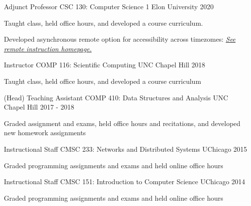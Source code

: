 
\begin{cventries}

  \cventry
    {Adjunct Professor} %
    {CSC 130: Computer Science 1} %
    {Elon University} %
    {2020} %
    {
      \begin{cvitems} %
        \item {Taught class, held office hours, and developed a course curriculum.}
        \item {Developed asynchronous remote option for accessibility across timezomes: \href{https://csc130s2020.wordpress.com/}{\textit{See remote instruction homepage.}}}
      \end{cvitems}
    }



  \cventry
    {Instructor} %
    {COMP 116: Scientific Computing} %
    {UNC Chapel Hill} %
    {2018} %
    {
      \begin{cvitems} %
        \item {Taught class, held office hours, and developed a course curriculum}
      \end{cvitems}
    }

  \cventry
    {(Head) Teaching Assistant} %
    {COMP 410: Data Structures and Analysis} %
    {UNC Chapel Hill} %
    {2017 - 2018} %
    {
      \begin{cvitems} %
        \item {Graded assignment and exams, held office hours and recitations, and developed new homework assignments}
      \end{cvitems}
    }

  \cventry
    {Instructional Staff} %
    {CMSC 233: Networks and Distributed Systems} %
    {UChicago} %
    {2015} %
    {
      \begin{cvitems} %
        \item {Graded programming assignments and exams and held online office hours}
      \end{cvitems}
    }
	
  \cventry
    {Instructional Staff} %
    {CMSC 151: Introduction to Computer Science} %
    {UChicago} %
    {2014} %
    {
      \begin{cvitems} %
        \item {Graded programming assignments and exams and held online office hours}
      \end{cvitems}
    }

\end{cventries}
